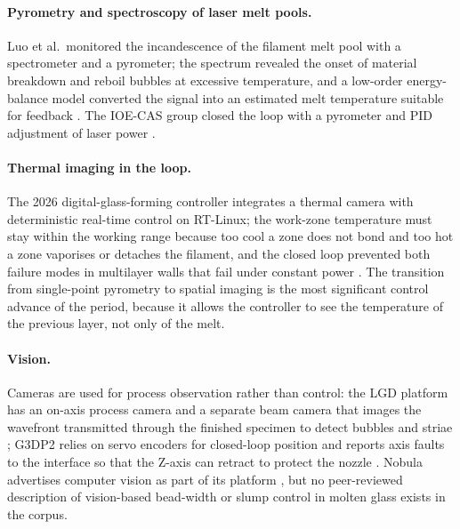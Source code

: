 \paragraph{Pyrometry and spectroscopy of laser melt pools.} Luo et al.\ monitored the incandescence of the filament melt pool with a spectrometer and a pyrometer; the spectrum revealed the onset of material breakdown and reboil bubbles at excessive temperature, and a low-order energy-balance model converted the signal into an estimated melt temperature suitable for feedback \citep{luo2017heat,luo2018quartz}. The IOE-CAS group closed the loop with a pyrometer and PID adjustment of laser power \citep{lgd2025tempctrl}.

\paragraph{Thermal imaging in the loop.} The 2026 digital-glass-forming controller integrates a thermal camera with deterministic real-time control on RT-Linux; the work-zone temperature must stay within the working range because too cool a zone does not bond and too hot a zone vaporises or detaches the filament, and the closed loop prevented both failure modes in multilayer walls that fail under constant power \citep{dgf2026control}. The transition from single-point pyrometry to spatial imaging is the most significant control advance of the period, because it allows the controller to see the temperature of the previous layer, not only of the melt.

\paragraph{Vision.} Cameras are used for process observation rather than control: the LGD platform has an on-axis process camera and a separate beam camera that images the wavefront transmitted through the finished specimen to detect bubbles and striae \citep{lgd2024homog}; G3DP2 relies on servo encoders for closed-loop position and reports axis faults to the interface so that the Z-axis can retract to protect the nozzle \citep{inamura2018}. Nobula advertises computer vision as part of its platform \citep{nobula_web}, but no peer-reviewed description of vision-based bead-width or slump control in molten glass exists in the corpus.


